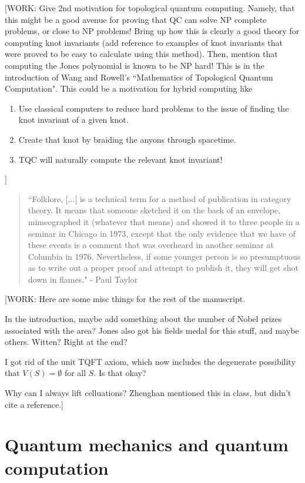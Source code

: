 \documentclass{article}
\theoremstyle{definition}
\numberwithin{figure}{section}
\begin{document}
[WORK: Give 2nd motivation for topological quantum computing. Namely, that this might be a good avenue for proving that QC can solve NP complete problems, or close to NP problems! Bring up how this is clearly a good theory for computing knot invariants (add reference to examples of knot invariants that were proved to be easy to calculate using this method). Then, mention that computing the Jones polynomial is known to be NP hard! This is in the introduction of Wang and Rowell's ``Mathematics of Topological Quantum Computation". This could be a motivation for hybrid computing like

\begin{enumerate}
\item Use classical computers to reduce hard problems to the issue of finding the knot invariant of a given knot.
\item Create that knot by braiding the anyons through spacetime.
\item TQC will naturally compute the relevant knot invariant!
\end{enumerate}
]

\begin{quote}
``Folklore, [...] is a technical term for a method of publication in category theory. It means that someone sketched it on the back of an envelope, mimeographed it (whatever that means) and showed it to three people in a seminar in Chicago in 1973, except that the only evidence that we have of these events is a comment that was overheard in another seminar at Columbia in 1976. Nevertheless, if some younger person is so presumptuous as to write out a proper proof and attempt to publish it, they will get shot down in flames." - Paul Taylor \cite{aubert2019categories}
\end{quote}

[WORK: Here are some misc things for the rest of the manuscript.

In the introduction, maybe add something about the number of Nobel prizes associated with the area? Jones also got his fields medal for this stuff, and maybe others. Witten? Right at the end?

I got rid of the unit TQFT axiom, which now includes the degenerate possibility that $V(S)=\emptyset$ for all $S$. Is that okay?

Why can I always lift celluations? Zhenghan mentioned this in class, but didn't cite a reference.]
\appendix

\section{Quantum mechanics and quantum computation}
\label{Quantum mechanics}
\end{document}
